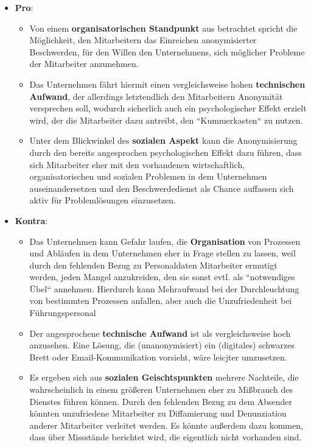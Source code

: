 \begin{itemize}
    \itemsep0.5em
    \item \textbf{Pro}:
    \begin{itemize}
        \item Von einem \textbf{organisatorischen Standpunkt} aus betrachtet spricht die Möglichkeit, den Mitarbeitern das Einreichen anonymisierter Beschwerden, für den Willen den Unternehmens, sich möglicher Probleme der Mitarbeiter anzunehmen.
        \item Das Unternehmen fährt hiermit einen vergleichsweise hohen \textbf{technischen Aufwand}, der allerdings letztendlich den Mitarbeitern Anonymität versprechen soll, wodurch sicherlich auch ein psychologischer Effekt erzielt wird, der die Mitarbeiter dazu antreibt, den ``Kummerkasten`` zu nutzen.
        \item Unter dem Blickwinkel des \textbf{sozialen Aspekt} kann die Anonymisierung durch den bereits angesprochen psychologischen Effekt dazu führen, dass sich Mitarbeiter eher mit den vorhandenen wirtschaftlich, organisatorischen und sozialen Problemen in dem Unternehmen auseinandersetzen und den Beschwerdedienst als Chance auffassen sich aktiv für Problemlösungen einzusetzen.
    \end{itemize}
    \item \textbf{Kontra}:
    \begin{itemize}
        \item Das Unternehmen kann Gefahr laufen, die \textbf{Organisation} von Prozessen und Abläufen in dem Unternehmen eher in Frage stellen zu lassen, weil durch den fehlenden Bezug zu Personaldaten Mitarbeiter ermutigt werden, jeden Mangel anzukreiden, den sie sonst evtl. als ``notwendiges Übel`` annehmen. Hierdurch kann Mehraufwand bei der Durchleuchtung von bestimmten Prozessen anfallen, aber auch die Unzufriedenheit bei Führungspersonal
        \item Der angesprochene \textbf{technische Aufwand} ist als vergleichsweise hoch anzusehen.
        Eine Lösung, die (unanonymisiert) ein (digitales) schwarzes Brett oder Email-Kommunikation vorsieht, wäre leicjter umzusetzen.
        \item Es ergeben sich aus \textbf{sozialen Geischtspunkten} mehrere Nachteile, die wahrscheinlich in einem größeren Unternehmen eher zu Mißbrauch des Dienstes führen können.
        Durch den fehlenden Bezug zu dem Absender könnten unzufriedene Mitarbeiter zu Diffamierung und Denunziation anderer Mitarbeiter verleitet werden.
        Es könnte außerdem dazu kommen, dass über Missstände berichtet wird, die eigentlich nicht vorhanden sind.
    \end{itemize}
\end{itemize}

